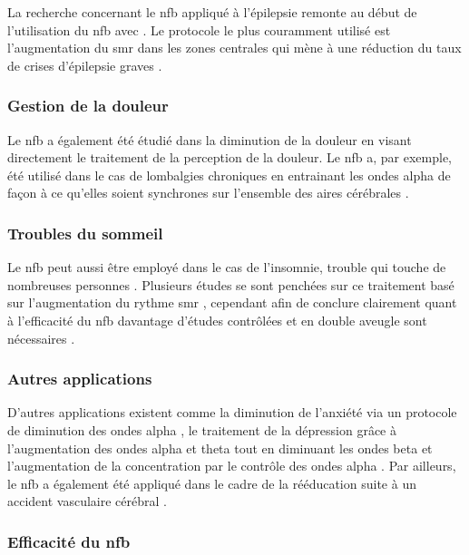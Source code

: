 La recherche concernant le \gls{nfb} appliqué à l'épilepsie remonte au début de l'utilisation du \gls{nfb} avec \citet{Sterman1974}. Le protocole le plus
couramment utilisé est l'augmentation du \gls{smr} dans les zones centrales qui mène à une réduction du taux de crises 
d'épilepsie graves \citep{Hughes2008, Walker2010, Tan2009, Sterman2010}.

\subsubsection{Gestion de la douleur}

Le \gls{nfb} a également été étudié dans la diminution de la douleur en visant directement le traitement de la perception de la douleur. Le \gls{nfb} a, par
exemple, été utilisé dans le cas de lombalgies chroniques en entrainant les ondes alpha de façon à ce qu'elles soient synchrones sur l'ensemble des aires 
cérébrales \citep{Mcknight2001, Thapa2018, Mayaud2019}.

\subsubsection{Troubles du sommeil}

Le \gls{nfb} peut aussi être employé dans le cas de l'insomnie, trouble qui touche de nombreuses personnes \citep{Marzbani2016}. Plusieurs études se sont penchées sur ce traitement
basé sur l'augmentation du rythme \gls{smr} \citep{Schabus2014, Schabus2017}, cependant afin de conclure clairement quant à l'efficacité du \gls{nfb} davantage 
d'études contrôlées et en double aveugle sont nécessaires \citep{Micoulaud2019sommeil}. 

\subsubsection{Autres applications}

D'autres applications existent comme la diminution de l'anxiété via un protocole de diminution des ondes alpha \citep{Budzynski2009}, le traitement de la dépression
grâce à l'augmentation des ondes alpha et theta tout en diminuant les ondes beta \citep{Hurt2014} et l'augmentation de la concentration par le contrôle des ondes
alpha \citep{Babiloni2008, Berka2010}. Par ailleurs, le \gls{nfb} a également été appliqué dans le cadre de la rééducation suite à un accident vasculaire cérébral \citep{Biasiucci2018,
Cervera2018}. 

\subsubsection{Efficacité du \gls{nfb}}
 
